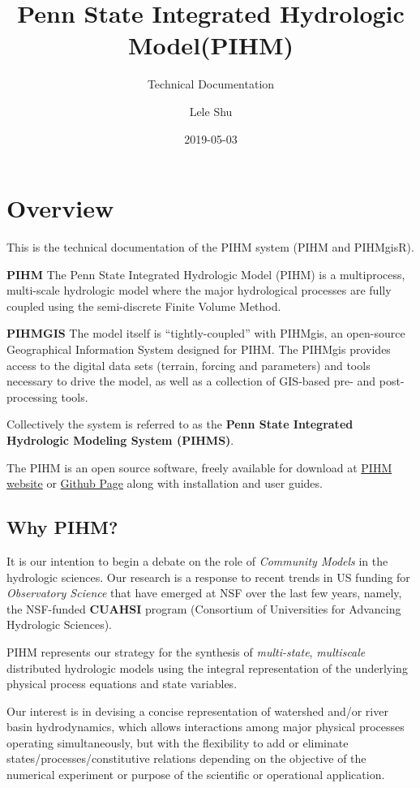 \documentclass[]{scrbook}
\title{Penn State Integrated Hydrologic Model(PIHM)}
\subtitle{Technical Documentation}
\author{Lele Shu}
\date{2019-05-03}
\begin{document}
\maketitle

{
\setcounter{tocdepth}{1}
\tableofcontents
}
\chapter{Overview}\label{Overview}

This is the technical documentation of the PIHM system (PIHM and
PIHMgisR).

\textbf{PIHM} The Penn State Integrated Hydrologic Model (PIHM) is a
multiprocess, multi-scale hydrologic model where the major hydrological
processes are fully coupled using the semi-discrete Finite Volume
Method.

\textbf{PIHMGIS} The model itself is ``tightly-coupled'' with PIHMgis,
an open-source Geographical Information System designed for PIHM. The
PIHMgis provides access to the digital data sets (terrain, forcing and
parameters) and tools necessary to drive the model, as well as a
collection of GIS-based pre- and post-processing tools.

Collectively the system is referred to as the \textbf{Penn State
Integrated Hydrologic Modeling System (PIHMS)}.

The PIHM is an open source software, freely available for download at
\href{www.pihm.psu.edu}{PIHM website} or
\href{https://github.com/shulele/PIHM++}{Github Page} along with
installation and user guides.

\section{Why PIHM?}\label{why-pihm}

It is our intention to begin a debate on the role of \emph{Community
Models} in the hydrologic sciences. Our research is a response to recent
trends in US funding for \emph{Observatory Science} that have emerged at
NSF over the last few years, namely, the NSF-funded \textbf{CUAHSI}
program (Consortium of Universities for Advancing Hydrologic Sciences).

PIHM represents our strategy for the synthesis of \emph{multi-state},
\emph{multiscale} distributed hydrologic models using the integral
representation of the underlying physical process equations and state
variables.

Our interest is in devising a concise representation of watershed and/or
river basin hydrodynamics, which allows interactions among major
physical processes operating simultaneously, but with the flexibility to
add or eliminate states/processes/constitutive relations depending on
the objective of the numerical experiment or purpose of the scientific
or operational application.
\end{document}
